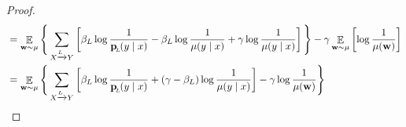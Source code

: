 \documentclass{article}
\newcommand{\bp}[1][L]{\mat{p}_{\!_{#1}\!}}
\begin{document}
\begin{proof}
\begin{align*}
                &= \E_{\mat w \sim \mu} \Bigg\{   \sum_{ X \xrightarrow{\!\!L} Y  } \left[
                    \beta_L \log \frac{1}{\bp(y\mid x)}   - \beta_L  \log \frac{1}{\mu(y \mid x)}+ \gamma \log \frac{1}{\mu(y \mid x)} \right]\Bigg\}  -  \gamma  \E_{\mat w \sim \mu} \left[\log \frac{1}{\mu(\mat w)}\right] \\
                &=  \E_{\mat w \sim \mu} \Bigg\{ \sum_{ X \xrightarrow{\!\!L} Y  } \left[
                    \beta_L \log \frac{1}{\bp(y\mid x)} + (\gamma - \beta_L ) \log \frac{1}{\mu(y \mid x)} \right] - \gamma \log \frac{1}{\mu(\mat w)} \Bigg\} 
        \end{align*}
    \end{proof}
\end{document}
